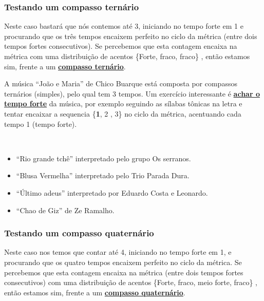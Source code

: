 \subsubsection{Testando um compasso ternário}
Neste caso bastará que nós contemos até 3, iniciando no tempo forte em 1 
e procurando que os três tempos encaixem perfeito no ciclo da métrica (entre dois tempos fortes consecutivos).
Se percebemos que esta contagem encaixa na métrica
com uma distribuição de acentos \{Forte, fraco, fraco\} \cite[pp. 10]{wright1992social}, 
então estamos sim, frente a um  \hyperref[subsec:compassoternario]{\textbf{compasso ternário}}.

\begin{example}
\label{ex:compassosimples3t3}
A música ``João e Maria'' de Chico Buarque 
está composta por compassos ternários (simples), pelo qual tem 3 tempos.
Um exercício interessante é \hyperref[subsec:perceberTF1]{\textbf{achar o tempo forte}} da música,
por exemplo seguindo as sílabas tônicas na letra  
e tentar encaixar a sequencia \{\textbf{1}, 2 , 3\} no ciclo da métrica, 
acentuando cada tempo 1 (tempo forte). 
\end{example}

\begin{example}
\label{ex:compassosimples3t2}
~
\begin{itemize}
\item ``Rio grande tchê'' interpretado pelo grupo Os serranos.
\item ``Blusa Vermelha'' interpretado pelo Trio Parada Dura.
\item ``Último adeus'' interpretado por Eduardo Costa e Leonardo.
\item ``Chao de Giz'' de Ze Ramalho.
\end{itemize}
\end{example}

\subsubsection{Testando um compasso quaternário}
Neste caso nos temos que contar até 4, iniciando no tempo forte em 1,
e procurando que os quatro tempos encaixem perfeito no ciclo da métrica.
Se percebemos que esta contagem encaixa na métrica (entre dois tempos fortes consecutivos)
com uma distribuição de acentos \{Forte, fraco, meio forte, fraco\} \cite[pp. 10]{wright1992social}, 
então estamos sim, frente a um  \hyperref[subsec:compassoquaternario]{\textbf{compasso quaternário}}.


